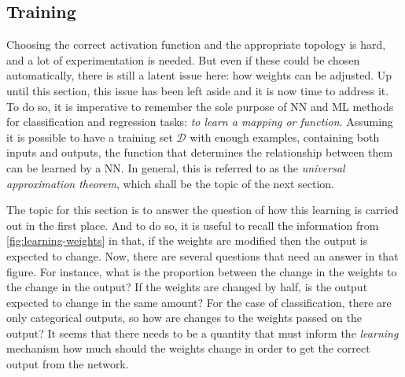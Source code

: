 \subsection{Training}
Choosing the correct activation function and the appropriate topology is hard, and a lot of 
experimentation is needed. But even if these could be chosen automatically, there is still 
a latent issue here: how weights can be adjusted. Up until this section, this issue has 
been left aside and it is now time to address it. To do so, it is imperative to remember 
the sole purpose of NN and ML methods for classification and regression tasks: 
\emph{to learn a mapping or function}. 
Assuming it is possible to have a training set \(\mathcal{D}\) with enough examples, 
containing both inputs and outputs, the function that determines the relationship between 
them can be learned by a NN. In general, this is referred to as the 
\emph{universal approximation theorem}, which shall be the topic of the next section.

The topic for this section is to answer the question of how this learning is carried out in 
the first place. And to do so, it is useful to recall the information from 
\autoref{fig:learning-weights} in that, if the weights are modified then the output is 
expected to change. Now, there are several questions that need an answer in that figure. 
For instance, what is the proportion between the change in the weights to the change in the 
output? If the weights are changed by half, is the output expected to change in the same 
amount? For the case of classification, there are only categorical outputs, so how are 
changes to the weights passed on the output? It seems that there needs to be a quantity 
that must inform the \emph{learning} mechanism how much should the weights change in order 
to get the correct output from the network. 

